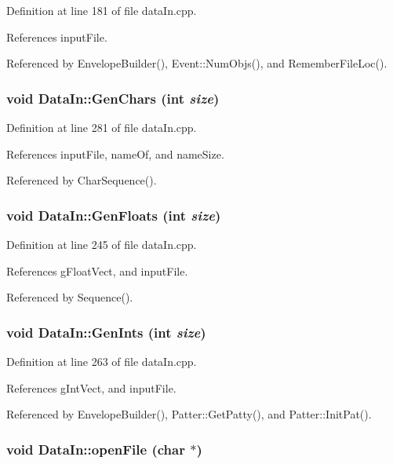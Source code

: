 Definition at line 181 of file data\-In.cpp.

References input\-File.

Referenced by Envelope\-Builder(), Event::Num\-Objs(), and Remember\-File\-Loc().
\subsubsection{\setlength{\rightskip}{0pt plus 5cm}void Data\-In::Gen\-Chars (int {\em size})}\label{classDataIn_a10}




Definition at line 281 of file data\-In.cpp.

References input\-File, name\-Of, and name\-Size.

Referenced by Char\-Sequence().
\subsubsection{\setlength{\rightskip}{0pt plus 5cm}void Data\-In::Gen\-Floats (int {\em size})}\label{classDataIn_a9}




Definition at line 245 of file data\-In.cpp.

References g\-Float\-Vect, and input\-File.

Referenced by Sequence().
\subsubsection{\setlength{\rightskip}{0pt plus 5cm}void Data\-In::Gen\-Ints (int {\em size})}\label{classDataIn_a8}




Definition at line 263 of file data\-In.cpp.

References g\-Int\-Vect, and input\-File.

Referenced by Envelope\-Builder(), Patter::Get\-Patty(), and Patter::Init\-Pat().
\subsubsection{\setlength{\rightskip}{0pt plus 5cm}void Data\-In::open\-File (char $\ast$)}\label{classDataIn_a18}




